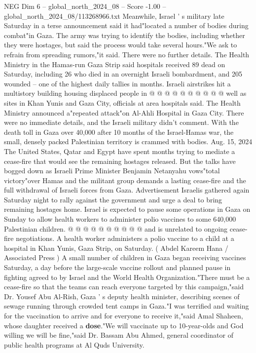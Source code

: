 \begin{textsample}{NEG Dim 6 – global\_north\_2024\_08 – Score -1.00 – global\_north\_2024\_08/113268966.txt}
Meanwhile, Israel ' s military late Saturday in a terse announcement said it had"located a number of bodies during combat"in Gaza.
The army was trying to identify the bodies, including whether they were hostages, but said the process would take several hours."We ask to refrain from spreading rumors,"it said.
There were no further details.
The Health Ministry in the Hamas-run Gaza Strip said hospitals received 89 dead on Saturday, including 26 who died in an overnight Israeli bombardment, and 205 wounded -- one of the highest daily tallies in months.
Israeli airstrikes hit a multistory building housing displaced people in @ @ @ @ @ @ @ @ @ @ well as sites in Khan Yunis and Gaza City, officials at area hospitals said.
The Health Ministry announced a"repeated attack"on Al-Ahli Hospital in Gaza City.
There were no immediate details, and the Israeli military didn't comment.
With the death toll in Gaza over 40,000 after 10 months of the Israel-Hamas war, the small, densely packed Palestinian territory is crammed with bodies.
Aug. 15, 2024 The United States, Qatar and Egypt have spent months trying to mediate a cease-fire that would see the remaining hostages released.
But the talks have bogged down as Israeli Prime Minister Benjamin Netanyahu vows"total victory"over Hamas and the militant group demands a lasting cease-fire and the full withdrawal of Israeli forces from Gaza.
Advertisement Israelis gathered again Saturday night to rally against the government and urge a deal to bring remaining hostages home.
Israel is expected to pause some operations in Gaza on Sunday to allow health workers to administer polio vaccines to some 640,000 Palestinian children. @ @ @ @ @ @ @ @ @ @ and is unrelated to ongoing cease-fire negotiations.
A health worker administers a polio vaccine to a child at a hospital in Khan Yunis, Gaza Strip, on Saturday. ( Abdel Kareem Hana / Associated Press ) A small number of children in Gaza began receiving vaccines Saturday, a day before the large-scale vaccine rollout and planned pause in fighting agreed to by Israel and the World Health Organization."There must be a cease-fire so that the teams can reach everyone targeted by this campaign,"said Dr.
Yousef Abu Al-Rish, Gaza ' s deputy health minister, describing scenes of sewage running through crowded tent camps in Gaza."I was terrified and waiting for the vaccination to arrive and for everyone to receive it,"said Amal Shaheen, whose daughter received a \textbf{dose}."We will vaccinate up to 10-year-olds and God willing we will be fine,"said Dr.
Bassam Abu Ahmed, general coordinator of public health programs at Al Quds University.

\end{textsample}
